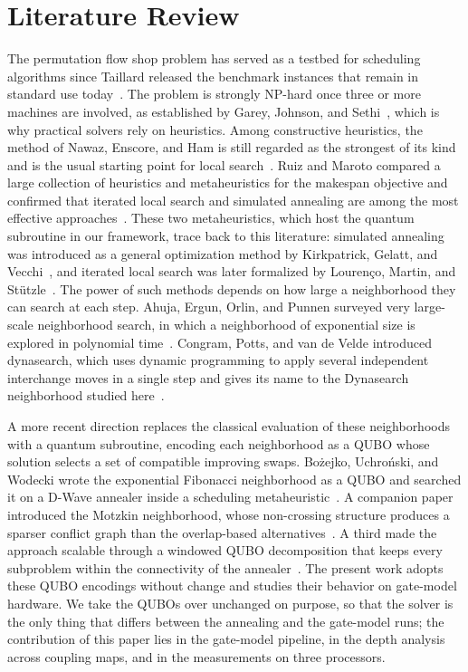 \documentclass{svproc}
\newcommand{\rev}[1]{{\color{blue}#1}}
\newcommand{\rev}[1]{#1}
\begin{document}
\section{Literature Review}
\label{sec:related}
The permutation flow shop problem has served as a testbed for scheduling
algorithms since Taillard released the benchmark instances that remain in
standard use today~\cite{taillard1993}. The problem is strongly NP-hard
once three or more machines are involved, as established by Garey,
Johnson, and Sethi~\cite{garey1976}, which is why practical solvers rely
on heuristics. Among constructive heuristics, the method of Nawaz,
Enscore, and Ham is still regarded as the strongest of its kind and is
the usual starting point for local search~\cite{neh1983}. Ruiz and Maroto
compared a large collection of heuristics and metaheuristics for the
makespan objective and confirmed that iterated local search and simulated
annealing are among the most effective approaches~\cite{ruizmaroto2005}.
These two metaheuristics, which host the quantum subroutine in our
framework, trace back to this literature: simulated annealing was
introduced as a general optimization method by Kirkpatrick, Gelatt, and
Vecchi~\cite{kirkpatrick1983}, and iterated local search was later
formalized by Louren\c{c}o, Martin, and St\"{u}tzle~\cite{lourenco2003}.
The power of such methods depends on how large a neighborhood they can
search at each step. Ahuja, Ergun, Orlin, and Punnen surveyed very
large-scale neighborhood search, in which a neighborhood of exponential
size is explored in polynomial time~\cite{ahuja2002}. Congram, Potts, and
van de Velde introduced dynasearch, which uses dynamic programming to
apply several independent interchange moves in a single step and gives
its name to the Dynasearch neighborhood studied here~\cite{congram2002}.

A more recent direction replaces the classical evaluation of these
neighborhoods with a quantum subroutine, encoding each neighborhood as a
QUBO whose solution selects a set of compatible improving swaps. \rev{Bo\.{z}ejko,
Uchro\'{n}ski, and Wodecki wrote the exponential Fibonacci neighborhood as a
QUBO and searched it on a D-Wave annealer inside a scheduling
metaheuristic~\cite{bozejko2026fibonacci}.} A companion paper
introduced the Motzkin neighborhood, whose non-crossing structure
produces a sparser conflict graph than the overlap-based
alternatives~\cite{wojewodzki2026soco}. A third made the approach
scalable through a windowed QUBO decomposition that keeps every
subproblem within the connectivity of the
annealer~\cite{wojewodzki2026windowed}. The present work adopts these
QUBO encodings without change and studies their behavior on gate-model
hardware. \rev{We take the QUBOs over unchanged on purpose, so that the solver
is the only thing that differs between the annealing and the gate-model runs;
the contribution of this paper lies in the gate-model pipeline, in the depth
analysis across coupling maps, and in the measurements on three processors.}
\end{document}
